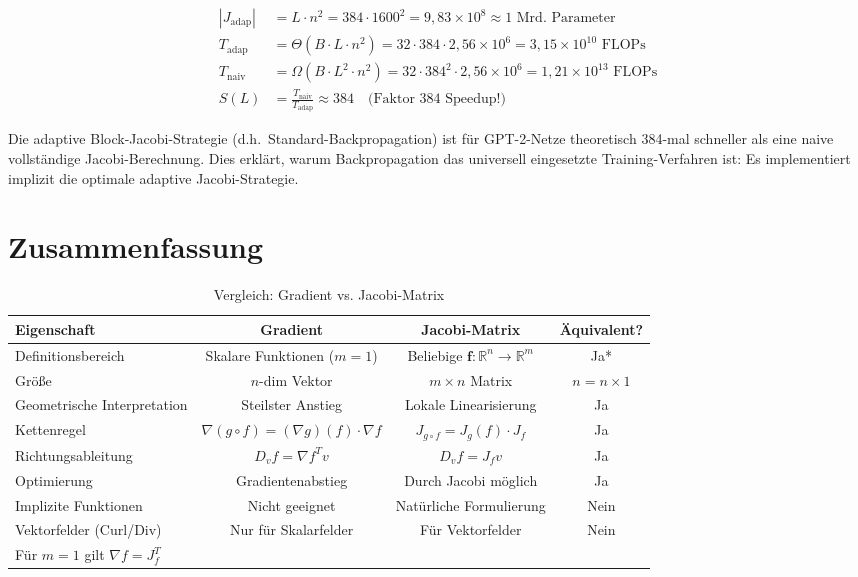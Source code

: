 ﻿\documentclass[a4paper,12pt]{article}
\theoremstyle{definition}
\begin{document}
\begin{align*}
	|J_{\mathrm{adap}}| &= L \cdot n^2 = 384 \cdot 1600^2 = 9{,}83 \times 10^8 \approx 1\text{ Mrd. Parameter} \\
	T_{\mathrm{adap}} &= \Theta(B \cdot L \cdot n^2) = 32 \cdot 384 \cdot 2{,}56 \times 10^6 = 3{,}15 \times 10^{10} \text{ FLOPs} \\
	T_{\mathrm{naiv}} &= \Omega(B \cdot L^2 \cdot n^2) = 32 \cdot 384^2 \cdot 2{,}56 \times 10^6 = 1{,}21 \times 10^{13} \text{ FLOPs} \\
	S(L) &= \frac{T_{\mathrm{naiv}}}{T_{\mathrm{adap}}} \approx 384 \quad \text{(Faktor 384 Speedup!)}
\end{align*}

Die adaptive Block-Jacobi-Strategie (d.h.\ Standard-Backpropagation) ist für GPT-2-Netze theoretisch 384-mal schneller als eine naive vollständige Jacobi-Berechnung. Dies erklärt, warum Backpropagation das universell eingesetzte Training-Verfahren ist: Es implementiert implizit die optimale adaptive Jacobi-Strategie.

\newpage
\section{Zusammenfassung}

\begin{table}[h]
	\centering
	\begin{tabular}{|l|c|c|c|}
		\toprule
		\textbf{Eigenschaft} & \textbf{Gradient} & \textbf{Jacobi-Matrix} & \textbf{Äquivalent?} \\
		\midrule
		Definitionsbereich & Skalare Funktionen ($m=1$) & Beliebige $\boldsymbol{f}: \mathbb{R}^n \to \mathbb{R}^m$ & Ja* \\
		Größe & $n$-dim Vektor & $m \times n$ Matrix & $n = n \times 1$ \\
		Geometrische Interpretation & Steilster Anstieg & Lokale Linearisierung & Ja \\
		Kettenregel & $\nabla(g \circ f) = (\nabla g)(f) \cdot \nabla f$ & $J_{g \circ f} = J_g(f) \cdot J_f$ & Ja \\
		Richtungsableitung & $D_v f = \nabla f^T v$ & $D_v f = J_f v$ & Ja \\
		Optimierung & Gradientenabstieg & Durch Jacobi möglich & Ja \\
		Implizite Funktionen & Nicht geeignet & Natürliche Formulierung & Nein \\
		Vektorfelder (Curl/Div) & Nur für Skalarfelder & Für Vektorfelder & Nein \\
		\bottomrule
		\multicolumn{4}{l}{\small *Für $m=1$ gilt $\nabla f = J_f^T$}
	\end{tabular}
	\caption{Vergleich: Gradient vs. Jacobi-Matrix}
	\label{tab:comparison}
\end{table}
\end{document}
